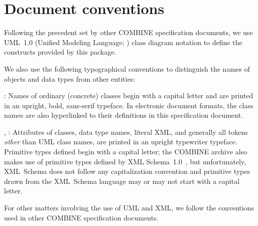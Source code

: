 \section{Document conventions} \label{conventions} 

Following the precedent set by other COMBINE specification
documents, we use UML~1.0 (Unified Modeling Language; 
\citet{eriksson:1998,oestereich:1999}) class diagram notation to 
define the constructs provided by this package. 

We also use the following typographical conventions to distinguish the 
names of objects and data types from other entities: 

\begin{description} 

\item {}: Names of ordinary (concrete) classes begin with a 
capital letter and are printed in an upright, bold, sans-serif typeface. 
In electronic document formats, the class names are also hyperlinked to 
their definitions in this specification document. 

\item {}, : Attributes of classes, data 
type names, literal XML, and generally all tokens \emph{other} than 
UML class names, are printed in an upright typewriter typeface. 
Primitive types defined begin with a capital letter; the COMBINE archive
also makes use of primitive types defined by XML 
Schema~1.0~\citep{biron:2000,fallside:2000,thompson:2000}, but 
unfortunately, XML~Schema does not follow any capitalization convention 
and primitive types drawn from the XML~Schema language may or may not 
start with a capital letter. 

\end{description} 

For other matters involving the use of UML and XML, we follow the 
conventions used in other COMBINE specification documents. 
